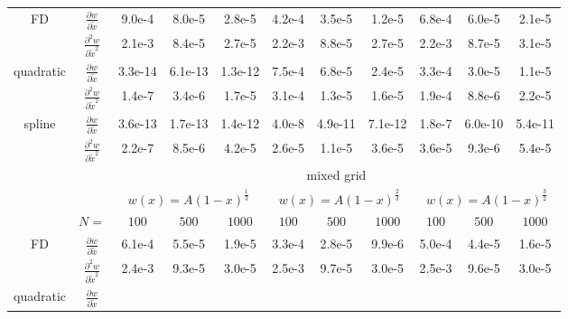 \begin{tabular}{cc|c|c|c|c|c|c|c|c|c|}
\\ \cline{1-11}
\multicolumn{1}{|c|}{\multirow{2}{*}{FD}} &
\multicolumn{1}{|c|}{$\frac{\partial w}{\partial \tilde x}$}
  &9.0e-4  &8.0e-5  &2.8e-5  &4.2e-4  &3.5e-5  &1.2e-5  &6.8e-4  &6.0e-5  &2.1e-5
\\ \cline{2-11}
\multicolumn{1}{|c|}{}                        &
\multicolumn{1}{|c|}{$\frac{\partial^2 w}{\partial \tilde x^2}$}
  &2.1e-3  &8.4e-5  &2.7e-5  &2.2e-3  &8.8e-5  &2.7e-5  &2.2e-3  &8.7e-5  &3.1e-5
\\ \cline{1-11}
\multicolumn{1}{|c|}{\multirow{2}{*}{quadratic}} &
\multicolumn{1}{|c|}{$\frac{\partial w}{\partial \tilde x}$}
  &3.3e-14  &6.1e-13  &1.3e-12  &7.5e-4  &6.8e-5  &2.4e-5  &3.3e-4  &3.0e-5  &1.1e-5
\\ \cline{2-11}
\multicolumn{1}{|c|}{}                        &
\multicolumn{1}{|c|}{$\frac{\partial^2 w}{\partial \tilde x^2}$}
  &1.4e-7  &3.4e-6  &1.7e-5  &3.1e-4  &1.3e-5  &1.6e-5  &1.9e-4  &8.8e-6  &2.2e-5
\\ \cline{1-11}
\multicolumn{1}{|c|}{\multirow{2}{*}{spline}} &
\multicolumn{1}{|c|}{$\frac{\partial w}{\partial \tilde x}$}
  &3.6e-13  &1.7e-13  &1.4e-12  &4.0e-8  &4.9e-11  &7.1e-12  &1.8e-7  &6.0e-10  &5.4e-11
\\ \cline{2-11}
\multicolumn{1}{|c|}{}                        &
\multicolumn{1}{|c|}{$\frac{\partial^2 w}{\partial \tilde x^2}$}
  &2.2e-7  &8.5e-6  &4.2e-5  &2.6e-5  &1.1e-5  &3.6e-5  &3.6e-5  &9.3e-6  &5.4e-5
\\ \cline{1-11}
& & \multicolumn{9}{|c|}{mixed grid}
\\ \cline{3-11}
& & \multicolumn{3}{|c|}{$w(x)=A(1-x)^\frac{1}{3}$} &  \multicolumn{3}{|c|}{$w(x)=A(1-x)^\frac{2}{3}$} &  \multicolumn{3}{|c|}{$w(x)=A(1-x)^\frac{3}{2}$}
\\ \cline{2-11}
& \multicolumn{1}{|c|}{$N=$} & $100$ & $500$ & $1000$ & $100$ & $500$ & $1000$ & $100$ & $500$ & $1000$
\\ \cline{1-11}
\multicolumn{1}{|c|}{\multirow{2}{*}{FD}} &
\multicolumn{1}{|c|}{$\frac{\partial w}{\partial \tilde x}$}
  &6.1e-4  &5.5e-5  &1.9e-5  &3.3e-4  &2.8e-5  &9.9e-6  &5.0e-4  &4.4e-5  &1.6e-5
\\ \cline{2-11}
\multicolumn{1}{|c|}{}                        &
\multicolumn{1}{|c|}{$\frac{\partial^2 w}{\partial \tilde x^2}$}
  &2.4e-3  &9.3e-5  &3.0e-5  &2.5e-3  &9.7e-5  &3.0e-5  &2.5e-3  &9.6e-5  &3.0e-5
\\ \cline{1-11}
\multicolumn{1}{|c|}{\multirow{2}{*}{quadratic}} &
\multicolumn{1}{|c|}{$\frac{\partial w}{\partial \tilde x}$}

\end{tabular}
